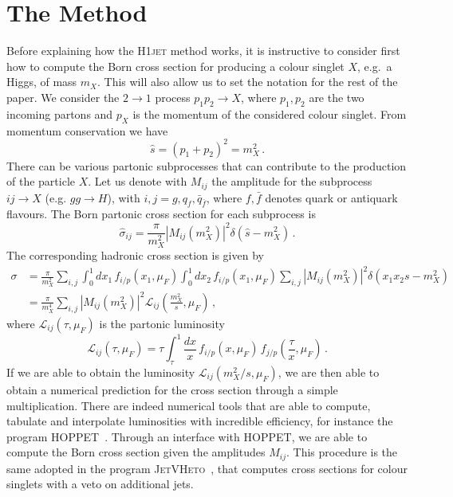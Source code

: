 \documentclass[12pt]{article}
\begin{document}
\section{The Method}
\label{sec:method}
Before explaining how the \textsc{H1jet} method works, it is instructive to
consider first how to compute the Born cross section for producing a
colour singlet $X$, e.g.\ a Higgs, of mass $m_X$. This will also allow
us to set the notation for the rest of the paper. We consider the
$2\to 1$ process $p_1 p_2 \to X$, where $p_1,p_2$ are the two incoming
partons and $p_X$ is the momentum of the considered colour
singlet. From momentum conservation we have 
\begin{equation}
  \label{eq:mom-conservation}
  \hat s = (p_1+p_2)^2=m_X^2\,.
\end{equation}
There can be various partonic subprocesses that can contribute to the
production of the particle $X$. Let us denote with $M_{ij}$ the
amplitude for the subprocess $ij\to X$ (e.g. $gg \to H$), with
$i,j=g,q_f,\bar q_{\bar f}$, where $f,\bar f$ denotes quark or
antiquark flavours. The Born partonic cross section for each
subprocess is
\begin{equation}
  \label{eq:Born-xsct}
  \hat\sigma_{ij}=\frac{\pi}{m_X^2} |M_{ij}(m_X^2)|^2 \delta\left(\hat s-m_X^2\right)\,.
\end{equation}
The corresponding hadronic cross section is given by
\begin{equation}
  \label{eq:Born-had}
  \begin{split}
  \sigma& =\frac{\pi}{m_X^2}\sum_{i,j} \int_0^1 dx_1\, f_{i/p}(x_1,\mu_F)\int_0^1 dx_2 \, f_{i/p}(x_1,\mu_F)\sum_{i,j}
 |M_{ij}(m_X^2)|^2 \delta\left(x_1 x_2 s-m_X^2\right)\\
   & = \frac{\pi}{m_X^4} \sum_{i,j} |M_{ij}(m_X^2)|^2 \mathcal{L}_{ij}\left(\frac{m_X^2}{s},\mu_F\right)
  \,,
    \end{split}
\end{equation}
where $\mathcal{L}_{ij}\left(\tau,\mu_F\right)$ is the partonic luminosity
\begin{equation}
  \label{eq:hoppet-lumi}
  \mathcal{L}_{ij}\left(\tau,\mu_F\right) = \tau \int_\tau^1 \frac{dx}{x}\, f_{i/p}(x,\mu_F)\, f_{j/p}\left(\frac{\tau}{x},\mu_F\right)\,.
\end{equation}
If we are able to obtain the luminosity
$\mathcal{L}_{ij}\left(m_X^2/s,\mu_F\right)$, we are then able to
obtain a numerical prediction for the cross section through a simple
multiplication. There are indeed numerical tools that are able to
compute, tabulate and interpolate luminosities with incredible
efficiency, for instance the program
\textsc{HOPPET}~\cite{Salam:2008qg}. Through an interface with \textsc{HOPPET}, we are
able to compute the Born cross section given the amplitudes
$M_{ij}$. This procedure is the same adopted in the program
\textsc{JetVHeto}~\cite{Banfi:2015pju}, that computes cross sections for colour
singlets with a veto on additional jets.
\end{document}
